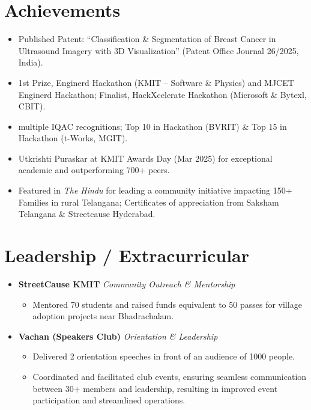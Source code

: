 \documentclass[letterpaper,10pt]{article}
\newcommand{\resumeItem}[1]{\item\footnotesize{#1\vspace{-1pt}}}
\begin{document}
\section{Achievements}
\begin{itemize}[leftmargin=0.15in, itemsep=0pt, topsep=0pt]
    \item \footnotesize Published Patent: “Classification \& Segmentation of Breast Cancer in Ultrasound Imagery with 3D Visualization” (Patent Office Journal 26/2025, India).
    \item \footnotesize 1st Prize, Enginerd Hackathon (KMIT – Software \& Physics) and MJCET Enginerd Hackathon; Finalist, HackXcelerate Hackathon (Microsoft \& Bytexl, CBIT).
    \item \footnotesize  multiple IQAC recognitions; Top 10 in Hackathon (BVRIT) \& Top 15 in Hackathon (t-Works, MGIT).
    \item \footnotesize Utkrishti Puraskar at KMIT Awards Day (Mar 2025) for exceptional academic and outperforming 700+ peers.
    \item \footnotesize Featured in \textit{The Hindu} for leading a community initiative impacting 150+ Families in rural Telangana; Certificates of appreciation from Saksham Telangana \& Streetcause Hyderabad.
\end{itemize}


\vspace{-.5em}
\section{Leadership / Extracurricular}
\begin{itemize}[leftmargin=0in, label={}, itemsep=0pt, topsep=0pt]
    \item \footnotesize \textbf{StreetCause KMIT} \hfill \textit{Community Outreach \& Mentorship}
          \begin{itemize}[leftmargin=0.15in, itemsep=0pt]
              \resumeItem{Mentored 70 students and raised funds equivalent to 50 passes for village adoption projects near Bhadrachalam.}
          \end{itemize}
    \item \footnotesize \textbf{Vachan (Speakers Club)} \hfill \textit{Orientation \& Leadership}
          \begin{itemize}[leftmargin=0.15in, itemsep=0pt]
              \resumeItem{Delivered 2 orientation speeches in front of an audience of 1000 people.}
              \resumeItem{Coordinated and facilitated club events, ensuring seamless communication between 30+ members and leadership, resulting in improved event participation and streamlined operations.}
          \end{itemize}
\end{itemize}
\end{document}

